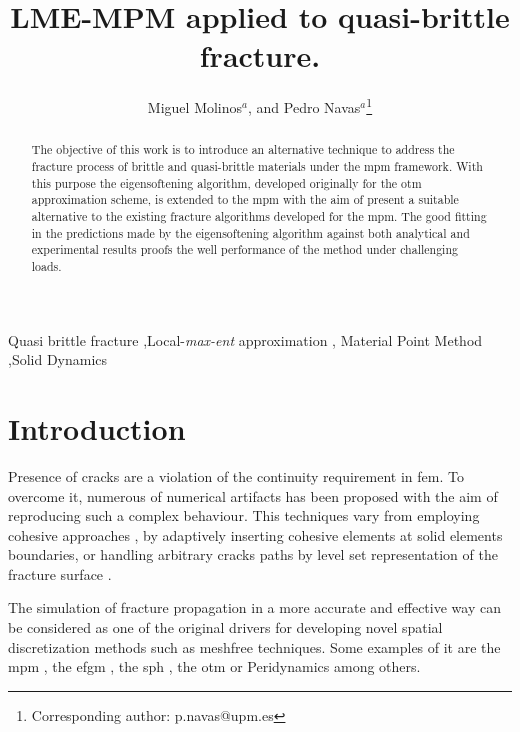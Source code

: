 \documentclass[preprint,12pt,a4paper]{elsarticle}
\begin{document}
\begin{frontmatter}

\title{LME-MPM applied to quasi-brittle fracture.}

\author{
Miguel Molinos$^a$,
and Pedro Navas$^a$\footnote{Corresponding author: p.navas@upm.es}
 }
 \address{
 $^a$ ETSI Caminos, Canales y Puertos, Universidad Polit\'ectnica de Madrid.\\
 c. Prof. Aranguren 3, 28040 Madrid, Spain
}

\begin{abstract}
  The objective of this work is to introduce an alternative
  technique to address the fracture process of brittle and
  quasi-brittle materials under the \acrfull{mpm} 
  framework. With this purpose the eigensoftening algorithm, developed
  originally for the \acrfull{otm} approximation scheme, is extended
  to the \acrshort{mpm} with the aim of present a suitable alternative to the
  existing fracture algorithms developed for the \acrshort{mpm}. The good fitting
  in the predictions made by the eigensoftening algorithm against both
  analytical and experimental results proofs the well performance of
  the method under challenging loads.
\end{abstract}

\begin{keyword}
Quasi brittle fracture \sep Local-\textit{max-ent} approximation \sep
Material Point Method \sep Solid Dynamics
\end{keyword}

\end{frontmatter}

\linenumbers

\section{Introduction}
\label{sec:1}
Presence of cracks are a violation of the continuity requirement in
\acrfull{fem}. To overcome it, numerous of numerical
artifacts has been proposed with the aim of reproducing  such a
complex behaviour. This techniques vary from employing cohesive
approaches \cite{Barenblatt,Hilleborg_1976}, by adaptively inserting
cohesive elements \cite{Ortiz_1999,Pandolfi_2002,Ruiz_2000} at solid
elements boundaries, or handling arbitrary cracks paths by level set
representation of the fracture surface \cite{Belytschko_03}.  

The simulation of fracture propagation in a more accurate and
effective way can be considered as one of the original drivers for
developing novel spatial discretization methods such as meshfree
techniques. Some examples of it are the \acrfull{mpm}
\cite{Schreyer_2002,Chen_2002,Nairn_2003,Zhenmao_2005}, the \acrfull{efgm}  \cite{BELYTSCHKO_1995,BELYTSCHKO_2000,Zhuang_2012,Muthu_2013},
the \acrfull{sph} \cite{Wang_2020,Wang_2019},
the \acrfull{otm} \cite{Li2010,Li_2012,Pandolfi_2013,Li_2015} or Peridynamics
\cite{HA_2011,RABCZUK_2017} among others. 
\end{document}
